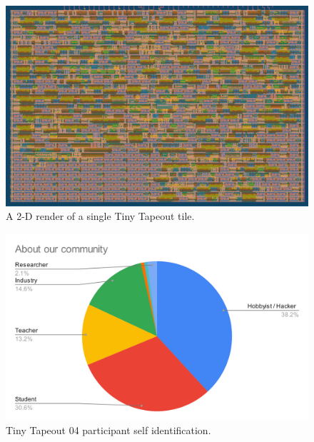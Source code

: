 \begin{figure}[!t]
\centering
\includegraphics[width=\columnwidth]{./Figs/gh action gds layout.png}
\caption{A 2-D render of a single Tiny Tapeout tile.}
\label{fig:render_cells_in_use}
\end{figure}

\begin{figure}[!t]
\centering
\includegraphics[width=\columnwidth]{./Figs/about our community pie chart.png}
\caption{Tiny Tapeout 04 participant self identification.}
\label{fig:TT04_submitters}
\end{figure}
